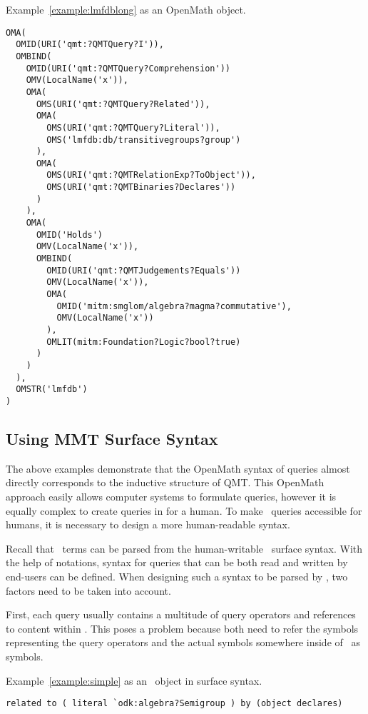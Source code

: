 \begin{example}\label{example:lmfdblongOM}
	Example~\ref{example:lmfdblong} as an OpenMath object. 
	\begin{lstlisting}[language=qmt]
OMA(
  OMID(URI('qmt:?QMTQuery?I')), 
  OMBIND(
    OMID(URI('qmt:?QMTQuery?Comprehension'))
    OMV(LocalName('x')), 
    OMA(
      OMS(URI('qmt:?QMTQuery?Related')), 
      OMA(
        OMS(URI('qmt:?QMTQuery?Literal')), 
        OMS('lmfdb:db/transitivegroups?group')
      ),
      OMA(
        OMS(URI('qmt:?QMTRelationExp?ToObject')), 
        OMS(URI('qmt:?QMTBinaries?Declares'))
      )
    ),
    OMA(
      OMID('Holds')
      OMV(LocalName('x')),
      OMBIND(
        OMID(URI('qmt:?QMTJudgements?Equals'))
        OMV(LocalName('x')), 
        OMA(
          OMID('mitm:smglom/algebra?magma?commutative'), 
          OMV(LocalName('x'))
        ), 
        OMLIT(mitm:Foundation?Logic?bool?true)
      )
    )
  ), 
  OMSTR('lmfdb')
)
\end{lstlisting}
\end{example}

\subsection{Using MMT Surface Syntax}\label{sec:omqueries:surface}

The above examples demonstrate that the OpenMath syntax of queries almost directly corresponds to the inductive structure of QMT. 
This OpenMath approach easily allows computer systems to formulate queries, however it is equally complex to create queries in for a human. 
To make \mmt\ queries accessible for humans, it is necessary to design a more human-readable syntax. 

Recall that \mmt\ terms can be parsed from the human-writable \mmt\ surface syntax. 
With the help of notations,  syntax for queries that can be both read and written by end-users can be defined. 
When designing such a syntax to be parsed by \mmt, two factors need to be taken into account. 

First, each query usually contains a multitude of query operators and references to content within \mmt. 
This poses a problem because both need to refer the symbols representing the query operators and the actual symbols somewhere inside of \mmt\ as symbols. 

\begin{example}\label{example:simpleSurface}
  Example~\ref{example:simple} as an \mmt\ object in surface syntax.  
  \begin{lstlisting}[language=qmt]
related to ( literal `odk:algebra?Semigroup ) by (object declares)
  \end{lstlisting}
\end{example}

